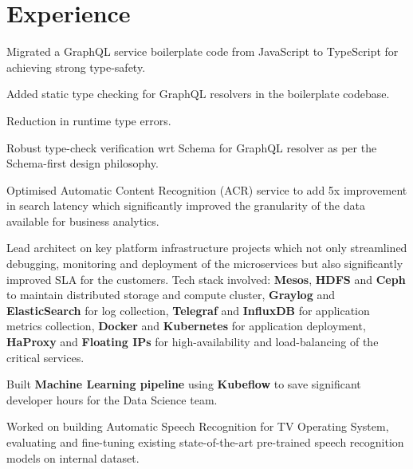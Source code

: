 \documentclass[]{deedy-resume-openfont}
\begin{document}
\hfill
\begin{minipage}[t]{0.66\textwidth} 


\section{Experience}
\vspace{\topsep}
\begin{tightemize}
\item Migrated a GraphQL service boilerplate code from JavaScript to TypeScript for achieving strong type-safety.
\item Added static type checking for GraphQL resolvers in the boilerplate codebase.
\item Reduction in runtime type errors.
\item Robust type-check verification wrt Schema for GraphQL resolver as per the Schema-first design philosophy. 
\end{tightemize}
\sectionsep

\vspace{\topsep} %
\begin{tightemize}
\item Optimised Automatic Content Recognition (ACR) service to add 5x improvement in search latency which significantly improved the granularity of the data available for business analytics.
\item Lead architect on key platform infrastructure projects which not only streamlined debugging, monitoring and deployment of the microservices but also significantly improved SLA for the customers. Tech stack involved: \textbf{Mesos}, \textbf{HDFS} and \textbf{Ceph} to maintain distributed storage and compute cluster, \textbf{Graylog} and \textbf{ElasticSearch} for log collection, \textbf{Telegraf} and \textbf{InfluxDB} for application metrics collection, \textbf{Docker} and \textbf{Kubernetes} for application deployment, \textbf{HaProxy} and \textbf{Floating IPs} for high-availability and load-balancing of the critical services.
\item Built \textbf{Machine Learning pipeline} using \textbf{Kubeflow} to save significant developer hours for the Data Science team.
\item Worked on building Automatic Speech Recognition for TV Operating System, evaluating and fine-tuning existing state-of-the-art pre-trained speech recognition models on internal dataset.
\end{tightemize}
\sectionsep


\end{minipage}
\end{document}
